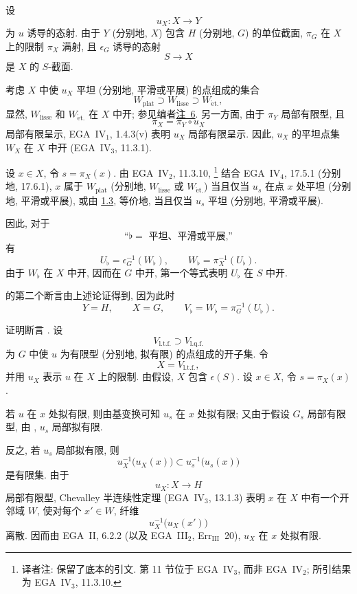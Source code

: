 设
\[
  u_X:X\longrightarrow Y
\]
为 \(u\) 诱导的态射. 由于 \(Y\) (分别地, \(X\))
包含 \(H\) (分别地, \(G\)) 的单位截面,
\(\pi_G\) 在 \(X\) 上的限制 \(\pi_X\) 满射,
且 \(\epsilon_G\) 诱导的态射
\[
  S\longrightarrow X
\]
是 \(X\) 的 \(S\)-截面.

考虑 \(X\) 中使 \(u_X\) 平坦 (分别地, 平滑或平展)
的点组成的集合
\[
  W_{\mathrm{plat}}
    \supset W_{\mathrm{lisse}}
    \supset W_{\mathrm{\acute{e}t.}},
\]
显然, \(W_{\mathrm{lisse}}\) 和 \(W_{\mathrm{\acute{e}t.}}\)
在 \(X\) 中开; 参见编者\hyperref[note:sga3-VIB-6]{注~6}.
另一方面, 由于 \(\pi_Y\) 局部有限型, 且
\[
  \pi_X=\pi_Y\circ u_X
\]
局部有限呈示, EGA~IV\(_1\), 1.4.3(v) 表明 \(u_X\) 局部有限呈示.
因此, \(u_X\) 的平坦点集 \(W_X\) 在 \(X\) 中开
(EGA~IV\(_3\), 11.3.1).

设 \(x\in X\), 令 \(s=\pi_X(x)\).
由 EGA~IV\(_2\), 11.3.10,%
\begingroup
\renewcommand{\thefootnote}{\fnsymbol{footnote}}%
\footnote[1]{\label{note:sga3-VIB-2.5-EGA-volume}译者注:
保留了底本的引文. 第 11 节位于 EGA~IV\(_3\), 而非 EGA~IV\(_2\);
所引结果为 EGA~IV\(_3\), 11.3.10.}%
\endgroup{}
结合 EGA~IV\(_4\), 17.5.1 (分别地, 17.6.1),
\(x\) 属于 \(W_{\mathrm{plat}}\)
(分别地, \(W_{\mathrm{lisse}}\) 或 \(W_{\mathrm{\acute{e}t.}}\))
当且仅当 \(u_s\) 在点 \(x\) 处平坦 (分别地, 平滑或平展),
或由 \hyperref[prop:sga3-VIB-1.3]{1.3}, 等价地,
当且仅当 \(u_s\) 平坦 (分别地, 平滑或平展).

因此, 对于
\[
  \text{``\(\flat=\) 平坦、平滑或平展,''}
\]
有
\[
  U_\flat=\epsilon_G^{-1}(W_\flat),
  \qquad
  W_\flat=\pi_X^{-1}(U_\flat).
\]
由于 \(W_\flat\) 在 \(X\) 中开, 因而在 \(G\) 中开,
第一个等式表明 \(U_\flat\) 在 \(S\) 中开.

\textup{} 的第二个断言由上述论证得到,
因为此时
\[
  Y=H,\qquad X=G,\qquad
  V_\flat=W_\flat=\pi_G^{-1}(U_\flat).
\]

证明断言 \textup{}.
设
\[
  V_{\mathrm{l.t.f.}}\supset V_{\mathrm{l.q.f.}}
\]
为 \(G\) 中使 \(u\) 为有限型 (分别地, 拟有限) 的点组成的开子集.
令
\[
  X=V_{\mathrm{l.t.f.}},
\]
并用 \(u_X\) 表示 \(u\) 在 \(X\) 上的限制.
由假设, \(X\) 包含 \(\epsilon(S)\).
设 \(x\in X\), 令 \(s=\pi_X(x)\).

若 \(u\) 在 \(x\) 处拟有限, 则由基变换可知 \(u_s\) 在 \(x\) 处拟有限;
又由于假设 \(G_s\) 局部有限型, 由
, \(u_s\) 局部拟有限.

反之, 若 \(u_s\) 局部拟有限, 则
\[
  u_X^{-1}\bigl(u_X(x)\bigr)
    \subset u_s^{-1}\bigl(u_s(x)\bigr)
\]
是有限集. 由于
\[
  u_X:X\longrightarrow H
\]
局部有限型, Chevalley 半连续性定理 (EGA~IV\(_3\), 13.1.3)
表明 \(x\) 在 \(X\) 中有一个开邻域 \(W\),
使对每个 \(x'\in W\), 纤维
\[
  u_X^{-1}\bigl(u_X(x')\bigr)
\]
离散. 因而由 EGA~II, 6.2.2
(以及 EGA~III\(_2\), Err\(_{\mathrm{III}}\)~20),
\(u_X\) 在 \(x\) 处拟有限.

